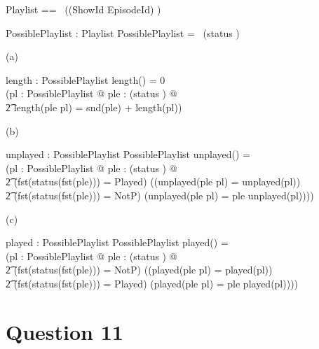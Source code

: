 \documentclass[a4paper,10pt,fleqn]{article}
\begin{document}
\begin{zed}
Playlist == \seq~((ShowId \cross EpisodeId) \cross \nat)
\end{zed}

\begin{axdef}
PossiblePlaylist : \power Playlist
\where
PossiblePlaylist = \seq~(\dom status \cross \nat)
\end{axdef}

\noindent\hspace*{\parindent}(a) \begin{axdef}
length : PossiblePlaylist \fun \nat
\where
length(\langle \rangle) = 0 \land \\
\quad (\forall pl : PossiblePlaylist @ \forall ple : (\dom status \cross \nat) @ \\
\t2 length(\langle ple \rangle \cat pl) = snd(ple) + length(pl))
\end{axdef}

\medskip

\noindent\hspace*{\parindent}(b) \begin{axdef}
unplayed : PossiblePlaylist \fun PossiblePlaylist
\where
unplayed(\langle \rangle) = \langle \rangle \land \\
\quad (\forall pl : PossiblePlaylist @ \forall ple : (\dom status \cross \nat) @ \\
\t2 (fst(status(fst(ple))) = Played) \implies ((unplayed(\langle ple \rangle \cat pl) = unplayed(pl)) \land \\
\t2 (fst(status(fst(ple))) = NotP) \implies (unplayed(\langle ple \rangle \cat pl) = \langle ple \rangle \cat unplayed(pl))))
\end{axdef}

\medskip

\noindent\hspace*{\parindent}(c) \begin{axdef}
played : PossiblePlaylist \fun PossiblePlaylist
\where
played(\langle \rangle) = \langle \rangle \land \\
\quad (\forall pl : PossiblePlaylist @ \forall ple : (\dom status \cross \nat) @ \\
\t2 (fst(status(fst(ple))) = NotP) \implies ((played(\langle ple \rangle \cat pl) = played(pl)) \land \\
\t2 (fst(status(fst(ple))) = Played) \implies (played(\langle ple \rangle \cat pl) = \langle ple \rangle \cat played(pl))))
\end{axdef}

\section*{Question 11}
\end{document}
